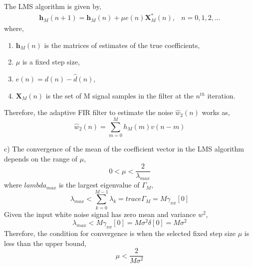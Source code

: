 \documentclass[12pt]{article}
\begin{document}
The LMS algorithm is given by,
\begin{equation}
\begin{array}{lr}
		\bm{h}_{M}(n+1)=\bm{h}_{M}(n)+\mu e(n)\bm{X}_{M}^{*}(n), & n=0,1,2,...
\end{array}
\end{equation}
where, 
\begin{enumerate}
	\item $\mathbf{h}_{M}(n)$ is the matrices of estimates of the true coefficients,
	\item $\mu$ is a fixed step size,
	\item $e(n)=d(n)-\hat{d}(n)$,
	\item $\bm{X}_{M}(n)$ is the set of M signal samples in the filter at the $n^{th}$ iteration.
\end{enumerate}
Therefore, the adaptive FIR filter to estimate the noise $\hat{w}_{2}(n)$ works as,
\begin{equation}
	\hat{w}_{2}(n)=\sum_{m=0}^{M}{h_{M}(m)v(n-m)}
\end{equation}

\noindent
c)
The convergence of the mean of the coefficient vector in the LMS algorithm depends on the range of $\mu$,
\begin{equation}
	0<\mu<\frac{2}{\lambda_{max}}
\end{equation}
where $lambda_{max}$ is the largest eigenvalue of $\Gamma_{M}$,
\begin{equation}
	\lambda_{max}<\sum_{k=0}^{M-1}{\lambda_{k}}=trace\Gamma_{M}=M\gamma_{xx}[0]
\end{equation}
Given the input white noise signal has zero mean and variance $w^{2}$, 
\begin{equation}
	\lambda_{max}<M\gamma_{xx}[0]=M\sigma^{2}\delta[0]=M\sigma^{2}
\end{equation}
Therefore, the condition for convergence is when the selected fixed step size $\mu$ is less than the upper bound,
\begin{equation}
	\mu<\frac{2}{M\sigma^{2}}
\end{equation}
\end{document}
